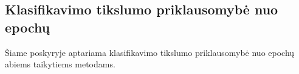 \subsection{Klasifikavimo tikslumo priklausomybė nuo epochų}
\label{subsec:tikslumas_nuo_epochu}

Šiame poskyryje aptariama klasifikavimo tikslumo priklausomybė nuo epochų abiems taikytiems metodams.


